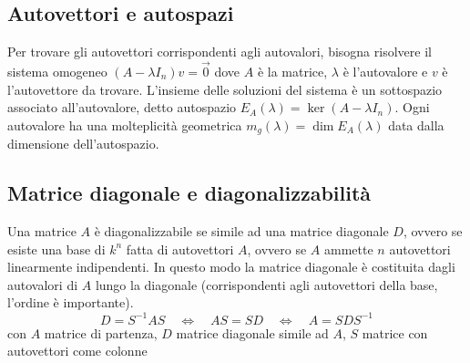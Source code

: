 \documentclass[a4paper]{article}
\begin{document}
\subsection{Autovettori e autospazi}
Per trovare gli autovettori corrispondenti agli autovalori, bisogna risolvere il sistema omogeneo \((A-\lambda I_n)v = \vec{0}\)
dove \(A\) è la matrice, \(\lambda\) è l'autovalore e \(v\) è l'autovettore da trovare. L'insieme delle soluzioni del sistema è
un sottospazio associato all'autovalore, detto autospazio \(E_A(\lambda) = \ker (A-\lambda I_n)\). Ogni autovalore ha una molteplicità
geometrica \(m_g(\lambda) = \dim E_A(\lambda)\) data dalla dimensione dell'autospazio.

\subsection{Matrice diagonale e diagonalizzabilità}
Una matrice \(A\) è diagonalizzabile se simile ad una matrice diagonale \(D\), ovvero se esiste una base di \(k^n\) fatta di
autovettori \(A\), ovvero se \(A\) ammette \(n\) autovettori linearmente indipendenti. In questo modo la matrice diagonale è
costituita dagli autovalori di \(A\) lungo la diagonale (corrispondenti agli autovettori della base, l'ordine è importante).
\[D = S^{-1} A S \quad \Leftrightarrow \quad AS = SD \quad \Leftrightarrow \quad A = S D S^{-1}\]
con \(A\) matrice di partenza, \(D\) matrice diagonale simile ad \(A\), \(S\) matrice con autovettori come colonne
\end{document}
